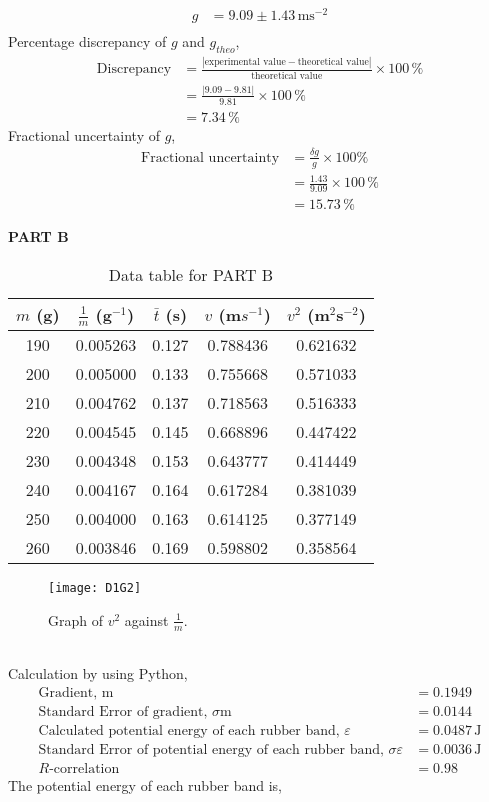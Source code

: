 \documentclass[a4paper,11pt]{article}
\begin{document}
\begin{align*}
g &= 9.09 \pm 1.43 \, \text{m}\text{s}^{-2} \\
\end{align*}
\noindent Percentage discrepancy of $g$ and $g_{theo}$,
\begin{align*}
\text{Discrepancy} &= \frac{|\text{experimental value} - \text{theoretical value}|}{\text{theoretical value}} \times 100\,\%\\
&= \frac{|9.09- 9.81|}{9.81} \times 100\,\%\\
&= 7.34\,\%
\end{align*}
Fractional uncertainty of $g$,
\begin{align*}
\text{Fractional uncertainty} &= \frac{\delta g}{g} \times 100\%\\
&= \frac{1.43}{9.09} \times 100\,\%\\
&= 15.73\,\%
\end{align*}
\newpage

\noindent \textbf{PART B}
\begin{table}[h!]
\centering
\begin{tabular}{ |c|c|c|c|c| } 
\hline
$m$ (g) & $\frac{1}{m}$ (g$^{-1}$) & $\bar{t}$ (s) & $v$ (m$s^{-1}$) & $v^2$ (m$^2$s$^{-2}$) \\
\hline
190 & 0.005263 & 0.127 & 0.788436 & 0.621632
\\
200 & 0.005000 & 0.133 & 0.755668 & 0.571033
\\
210 & 0.004762 & 0.137 & 0.718563 & 0.516333
\\
220 & 0.004545 & 0.145 & 0.668896 & 0.447422
\\
230 & 0.004348 & 0.153 & 0.643777 & 0.414449
\\
240 & 0.004167 & 0.164 & 0.617284 & 0.381039
\\
250 & 0.004000 & 0.163 & 0.614125 & 0.377149
\\
260 & 0.003846 & 0.169 & 0.598802 & 0.358564
\\
\hline
\end{tabular}
\caption{Data table for PART B}
\label{table:1}
\end{table}
\begin{figure}[ht]
    \centering
    \texttt{[image: D1G2]}
    \caption{Graph of $v^{2}$ against $\frac{1}{m}$.}
    \label{fig:setupC}
\end{figure}
\\
\noindent Calculation by using Python,
\begin{align*}
\text{Gradient, m} &= 0.1949 \\
\text{Standard Error of gradient, $\sigma$m} &= 0.0144 \\
\text{Calculated potential energy of each rubber band, $\varepsilon$} &= 0.0487 \, \text{J} \\
\text{Standard Error of potential energy of each rubber band, $\sigma \varepsilon$} &=  0.0036 \, \text{J} \\
R\text{-correlation} &=  0.98
\end{align*}
The potential energy of each rubber band is,
\end{document}
